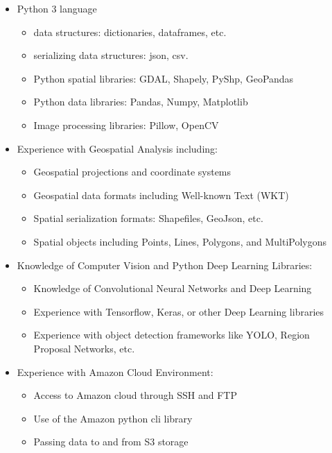 \documentclass[12pt, a4paper, oneside, headinclude, footinclude]{article}
\begin{document}
\begin{itemize}
\item Python 3 language 
    \begin{itemize}
      \item data structures: dictionaries, dataframes, etc. 
      \item serializing data structures: json, csv.
      \item Python spatial libraries: GDAL, Shapely, PyShp, GeoPandas
      \item Python data libraries: Pandas, Numpy, Matplotlib
      \item Image processing libraries: Pillow, OpenCV
    \end{itemize}
  \item Experience with Geospatial Analysis including:
    \begin{itemize}
      \item Geospatial projections and coordinate systems
      \item Geospatial data formats including Well-known Text (WKT)
      \item Spatial serialization formats: Shapefiles, GeoJson, etc.
      \item Spatial objects including Points, Lines, Polygons, and MultiPolygons
      \end{itemize}
  \item Knowledge of Computer Vision and Python Deep Learning Libraries:
    \begin{itemize}
      \item Knowledge of Convolutional Neural Networks and Deep Learning
      \item Experience with Tensorflow, Keras, or other Deep Learning libraries
      \item Experience with object detection frameworks like YOLO, Region
        Proposal Networks, etc. 
    \end{itemize}
  \item Experience with Amazon Cloud Environment:
    \begin{itemize}
      \item Access to Amazon cloud through SSH and FTP
      \item Use of the Amazon python cli library
      \item Passing data  to and from S3 storage
    \end{itemize}
\end{itemize}
\end{document}
